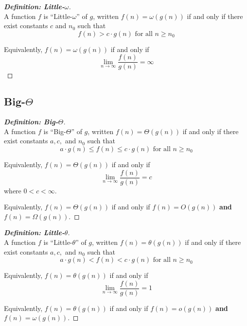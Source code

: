 \documentclass[a4paper]{article}
\newenvironment{definition}[1]{\begin{proof}[\textnormal{\textbf{Definition: #1}}]\mbox{}\\\phantom{\qedhere}}{\end{proof}}
\theoremstyle{definition}
\begin{document}
  \begin{definition}{Little-$\omega$}
  A function $f$ is ``Little-$\omega$'' of $g$, written $f(n)=\omega(g(n))$ if and only if there exist constants $c$ and $n_0$ such that \[f(n)> c\cdot g(n)\text{ for all }n\geq n_0\] 
  
  Equivalently, $f(n)=\omega(g(n))$ if and only if \[\lim_{n\to\infty}\frac{f(n)}{g(n)}=\infty\]
 \end{definition}

\subsection{Big-$\Theta$}
 \begin{definition}{Big-$\Theta$}
  A function $f$ is ``Big-$\Theta$'' of $g$, written $f(n)=\Theta(g(n))$ if and only if there exist constants $a, c,$ and $n_0$ such that \[a\cdot g(n) \leq f(n)\leq c\cdot g(n)\text{ for all }n\geq n_0\] 
  
  Equivalently, $f(n)=\Theta(g(n))$ if and only if \[\lim_{n\to\infty}\frac{f(n)}{g(n)}=c\] where $0<c<\infty$. 
  
  Equivalently, $f(n)=\Theta(g(n))$ if and only if $f(n)=O(g(n))$ \textbf{and} $f(n)=\Omega(g(n))$. 
 \end{definition}
 
  \begin{definition}{Little-$\theta$}
  A function $f$ is ``Little-$\theta$'' of $g$, written $f(n)=\theta(g(n))$ if and only if there exist constants $a, c,$ and $n_0$ such that \[a\cdot g(n) < f(n) < c\cdot g(n)\text{ for all }n\geq n_0\] 
  
  Equivalently, $f(n)=\theta(g(n))$ if and only if \[\lim_{n\to\infty}\frac{f(n)}{g(n)}=1\] 
  
  Equivalently, $f(n)=\theta(g(n))$ if and only if $f(n)=o(g(n))$ \textbf{and} $f(n)=\omega(g(n))$. 
 \end{definition}
 
\end{document}
